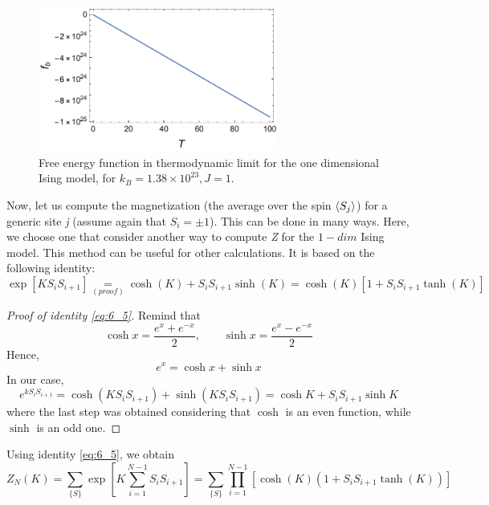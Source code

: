 \documentclass[../../Main/Main.tex]{subfiles}
\begin{document}
\begin{figure}[H]
\centering
\includegraphics[width=0.7\textwidth]{./img/3__1.pdf}
\caption{\label{fig:6_3} Free energy function in thermodynamic limit for the one dimensional Ising model, for \( k_B = 1.38 \times 10^{23}, J=1\). }
\end{figure}
Now, let us compute the magnetization (the average over the spin \( \expval{S_j}  \)) for a generic site \emph{j} (assume again that \( S_i = \pm 1 \)). This can be done in many ways. Here, we choose one that consider another way to compute \emph{Z} for the \( 1-dim \) Ising model. This method can be useful for other calculations. It is based on the following identity:
\begin{equation}
  \exp [ K S_i S_{i+1}] \underset{(proof)}{=}  \cosh ( K) + S_i S_{i+1} \sinh (K) = \cosh (K) [1+ S_i S_{i+1} \tanh (K)]
  \label{eq:6_5}
\end{equation}
\begin{proof}[Proof of identity \eqref{eq:6_5}]
Remind that 
\begin{equation*}
\cosh x = \frac{e^x + e ^{-x} }{2}, \qquad \sinh x = \frac{e^x - e ^{-x} }{2}
\end{equation*}
Hence, 
\begin{equation*}
    e^x = \cosh{x} + \sinh{x}
\end{equation*}
In our case, 
\begin{equation*}
 e^{k S_i S_{i+1}} = \cosh (K S_i S_{i+1}) +     \sinh (K S_i S_{i+1})
 = \cosh K + S_i S_{i+1} \sinh K 
\end{equation*}
where the last step was obtained considering that \( \cosh \) is an even function, while \( \sinh \) is an odd one.
\end{proof}
Using identity \eqref{eq:6_5}, we obtain
\begin{equation*}
  Z_N (K) = \sum_{\{ S \}  }^{}    \exp [K  \sum_{i=1}^{N-1} S_i S_{i+1}  ] = \sum_{\{ S \}  }^{}   \prod_{i=1}^{N-1} [ \cosh (K) (1+ S_i S_{i+1} \tanh (K))]
\end{equation*}
\end{document}
